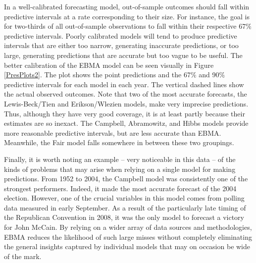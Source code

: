  In a well-calibrated forecasting model, out-of-sample outcomes should
 fall within predictive intervals at a rate corresponding to their
 size.  For instance, the goal is for two-thirds of all out-of-sample
 observations to fall within their respective 67\% predictive
 intervals.  Poorly calibrated models will tend to produce predictive
 intervals that are either too narrow, generating inaccurate
 predictions, or too large, generating predictions that are accurate
 but too vague to be useful.  The better calibration of the EBMA model
 can be seen visually in Figure \ref{PresPlots2}.  The plot shows the
 point predictions and the 67\% and 90\% predictive intervals for each
 model in each year.  The vertical dashed lines show the actual
 observed outcomes.  Note that two of the most accurate forecasts, the
 Lewis-Beck/Tien and Erikson/Wlezien models, make very imprecise
 predictions.  Thus, although they have very good coverage, it is at
 least partly because their estimates are so inexact.  The Campbell,
 Abramowitz, and Hibbs models provide more reasonable predictive
 intervals, but are less accurate than EBMA. Meanwhile, the Fair model
 falls somewhere in between these two groupings.


 Finally, it is worth noting an example -- very noticeable in this
 data -- of the kinds of problems that may arise when relying on a
 single model for making predictions.  From 1952 to 2004, the Campbell
 model was consistently one of the strongest performers.  Indeed, it
 made the most accurate forecast of the 2004 election.  However, one
 of the crucial variables in this model comes from polling data
 measured in early September.  As a result of the particularly late
 timing of the Republican Convention in 2008, it was the only model to
 forecast a victory for John McCain.  By relying on a wider array of
 data sources and methodologies, EBMA reduces the likelihood of such
 large misses without completely eliminating the general insights
 captured by individual models that may on occasion be wide of the
 mark.

